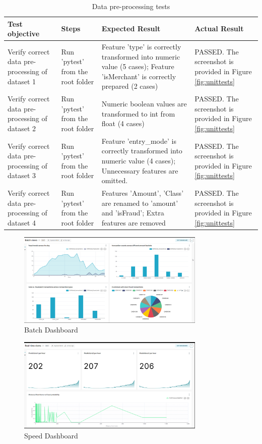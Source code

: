 \documentclass[12pt,a4paper, hidelinks]{article}
\begin{document}
\begin{table}[h!]
  \centering
  \begin{tabular}{|p{3cm}|p{2cm}|p{4cm}|p{5cm}|}
  \hline
  \textbf{Test objective} & \textbf{Steps} & \textbf{Expected Result} & \textbf{Actual Result} \\
  \hline
  Verify correct data pre-processing of dataset 1 & Run 'pytest' from the root folder & Feature 'type' is correctly transformed into numeric value (5 cases); Feature 'isMerchant' is correctly prepared (2 cases) & PASSED. The screenshot is provided in Figure \ref{fig:unittests} \\
  \hline
  Verify correct data pre-processing of dataset 2 & Run 'pytest' from the root folder & Numeric boolean values are transformed to int from float (4 cases) & PASSED. The screenshot is provided in Figure \ref{fig:unittests} \\
  \hline
  Verify correct data pre-processing of dataset 3 & Run 'pytest' from the root folder & Feature 'entry\_mode' is correctly transformed into numeric value (4 cases); Unnecessary features are omitted. & PASSED. The screenshot is provided in Figure \ref{fig:unittests} \\
  \hline
  Verify correct data pre-processing of dataset 4 & Run 'pytest' from the root folder & Features 'Amount', 'Class' are renamed to 'amount' and 'isFraud'; Extra features are removed & PASSED. The screenshot is provided in Figure \ref{fig:unittests} \\
  \hline
  \end{tabular}
  \caption{Data pre-processing tests}
  \end{table}

\begin{figure}[h!]
  \centering
  \includegraphics[width=0.8\textwidth]{images/superset-1.png}
  \caption{Batch Dashboard}
  \label{fig:batch-dashboard}
\end{figure}


\begin{figure}[h!]
  \centering
  \includegraphics[width=0.8\textwidth]{images/superset-2.png}
  \caption{Speed Dashboard}
  \label{fig:speed-dashboard}
\end{figure}
\end{document}
